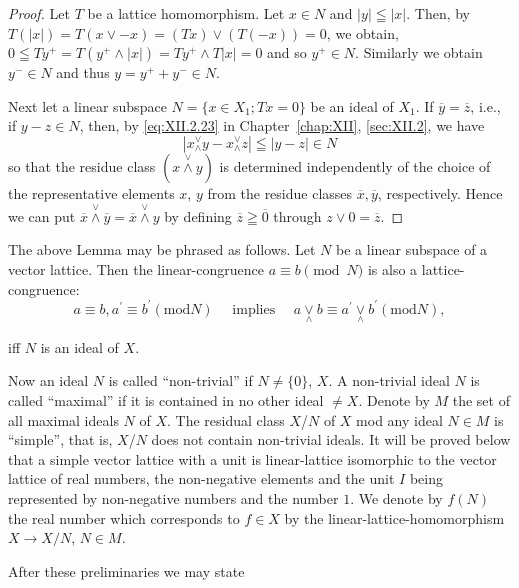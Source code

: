 \begin{proof}
 Let $T$ be a lattice homomorphism. Let $x \in N$ and $|y| \leqq |x|$. Then, by $T(|x|) = T(x \vee -x) = (Tx) \vee (T(-x)) = 0$, we obtain, $0 \leqq Ty^{+} = T(y^{+} \wedge |x|) = Ty^{+} \wedge T|x| = 0$ and so $y^{+} \in N$. Similarly we obtain $y^{-} \in N$ and thus $y = y^{+} + y^{-} \in N$. 


Next let a linear subspace $N = \{x \in X_1; Tx = 0\}$ be an ideal of $X_1$. If $\overline{y} = \overline{z}$, i.e., if $y - z \in N$, then, by \eqref{eq:XII.2.23} in Chapter~\ref{chap:XII}, \ref{sec:XII.2}, we have 
\[
\left| x _{\wedge} ^{\vee} y - x _{\wedge} ^{\vee} z \right| \leqq | y - z | \in N
\]
so that the residue class $(x \stackrel{\vee}{\wedge} y)$ is determined independently of the choice of the representative elements $x$, $y$ from the residue classes $\overline{x}, \overline{y}$, respectively. Hence we can put $\overline{x} \stackrel{\vee}{\wedge} \overline{y} = \overline{x} \stackrel{\vee}{\wedge} y$ by defining $\overline{z} \geqq \overline{0}$ through $z \vee 0 = \overline{z}$.
\end{proof}

\begin{remarku} The above Lemma may be phrased as follows. Let $N$ be a linear subspace of a vector lattice. Then the linear-congruence $a \equiv b \pmod{N}$ is also a lattice-congruence: 
\[
a \equiv b, a ^{\prime} \equiv b ^{\prime} (\mathrm{mod} N) \quad \text{ implies } \quad a \underset {\wedge} {\vee} b \equiv a ^{\prime} \underset {\wedge} {\vee} b ^{\prime} (\mathrm{mod} N),
\]
\end{remarku}

iff $N$ is an ideal of $X$. 

Now an ideal $N$ is called ``non-trivial'' if $N \neq \{0\}$, $X$. A non-trivial ideal $N$ is called ``maximal'' if it is contained in no other ideal $\neq X$. Denote by $M$ the set of all maximal ideals $N$ of $X$. The residual class $X$/$N$ of $X$ mod any ideal $N \in M$ is ``simple'', that is, $X$/$N$ does not contain non-trivial ideals. It will be proved below that a simple vector lattice with a unit is linear-lattice isomorphic to the vector lattice of real numbers, the non-negative elements and the unit $I$ being represented by non-negative numbers and the number $1$. We denote by $f(N)$ the real number which corresponds to $f \in X$ by the linear-lattice-homomorphism $X \to X/N$, $N \in M$. 

After these preliminaries we may state 

